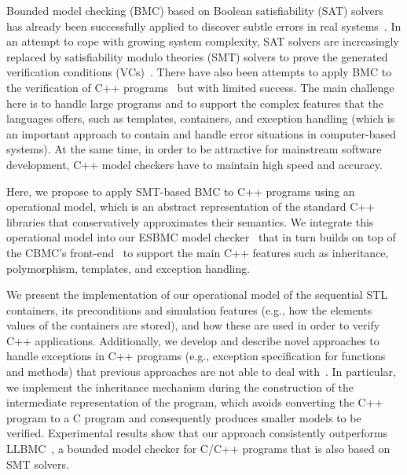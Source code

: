 \documentclass[conference]{IEEEtran}
\begin{document}
Bounded model checking (BMC) based on Boolean satisfiability (SAT) solvers
has already been successfully applied to discover
subtle errors in real systems~\cite{handbook09}. In an attempt to cope
with growing system complexity, SAT solvers are increasingly
replaced by satisfiability modulo theories (SMT) solvers to prove the generated
verification conditions (VCs)~\cite{Armando09,Cordeiro12,Ganai06}.
There have also been attempts to apply BMC to the verification of C++
programs~\cite{Florian12,Yang12} but with limited success. The main challenge
here is to handle large programs and to support the complex features that the
languages offers, such as templates, containers, and exception handling
(which is an important approach to contain and handle error situations
in computer-based systems). At the same time, in order to be attractive for
mainstream software development, C++ model checkers have to maintain high speed and accuracy.

Here, we propose to apply SMT-based BMC to C++ programs using an operational model, which
is an abstract representation of the standard C++ libraries that
conservatively approximates their semantics. We integrate this operational model
into our ESBMC model checker~\cite{Cordeiro12} that in turn builds on top
of the CBMC's front-end~\cite{Clarke04} to support the main C++ features such
as inheritance, polymorphism, templates, and exception handling.

We present the implementation of our operational model of the sequential STL
containers, its preconditions and simulation features (e.g., how the
elements values of the containers are stored), and how these are used in order to verify
C++ applications.  Additionally, we develop and describe novel approaches to handle
exceptions in C++ programs (e.g., exception specification for
functions and methods) that previous approaches are not able to deal
with~\cite{Blanc07,Florian12,PrabhuMBIG11}. In particular, we implement the
inheritance mechanism during the construction of the intermediate
representation of the program, which avoids converting the C++ program
to a C program and consequently produces smaller models to be verified.
Experimental results show that our approach consistently outperforms
LLBMC~\cite{Florian12}, a bounded model checker for C/C++ programs that is
also based on SMT solvers.
\end{document}

